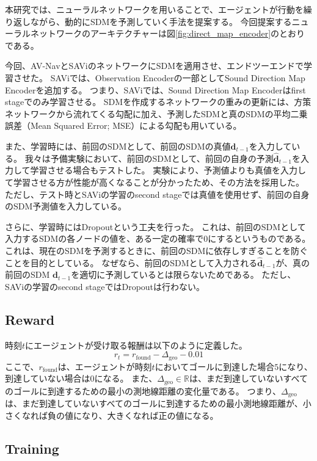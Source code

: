 本研究では、ニューラルネットワークを用いることで、エージェントが行動を繰り返しながら、動的にSDMを予測していく手法を提案する。
今回提案するニューラルネットワークのアーキテクチャーは図\ref{fig:direct_map_encoder}のとおりである。

今回、AV-Nav\cite{chen2020soundspaces}とSAVi\cite{chen2021semantic}のネットワークにSDMを適用させ、エンドツーエンドで学習させた。
SAViでは、Observation Encoderの一部としてSound Direction Map Encoderを追加する。
つまり、SAViでは、Sound Direction Map Encoderはfirst stageでのみ学習させる。
SDMを作成するネットワークの重みの更新には、方策ネットワークから流れてくる勾配に加え、予測したSDMと真のSDMの平均二乗誤差（Mean Squared Error; MSE）による勾配も用いている。

また、学習時には、前回のSDMとして、前回のSDMの真値$\boldsymbol{d}_{t-1}$を入力している。
我々は予備実験において、前回のSDMとして、前回の自身の予測$\hat{\boldsymbol{d}}_{t-1}$を入力して学習させる場合もテストした。
実験により、予測値よりも真値を入力して学習させる方が性能が高くなることが分かったため、その方法を採用した。
ただし、テスト時とSAViの学習のsecond stageでは真値を使用せず、前回の自身のSDM予測値を入力している。

さらに、学習時にはDropoutという工夫を行った。
これは、前回のSDMとして入力するSDMの各ノードの値を、ある一定の確率で0にするというものである。
これは、現在のSDMを予測するときに、前回のSDMに依存しすぎることを防ぐことを目的としている。
なぜなら、前回のSDMとして入力される$\hat{\boldsymbol{d}}_{t-1}$が、真の前回のSDM $\boldsymbol{d}_{t-1}$を適切に予測しているとは限らないためである。
ただし、SAViの学習のsecond stageではDropoutは行わない。


\subsection{Reward}

時刻$t$にエージェントが受け取る報酬は以下のように定義した。
\[
r_t = r_{\mathrm{found}} - \Delta_{\mathrm{geo}} - 0.01 \label{eq:reward_definition}
\]
ここで、$r_{\mathrm{found}}$は、エージェントが時刻$t$においてゴールに到達した場合$5$になり、到達していない場合は$0$になる。
また、$\Delta_{\mathrm{geo}} \in \mathbb{R}$は、まだ到達していないすべてのゴールに到達するための最小の測地線距離の変化量である。
つまり、$\Delta_{\mathrm{geo}}$は、まだ到達していないすべてのゴールに到達するための最小測地線距離が、小さくなれば負の値になり、大きくなれば正の値になる。



\subsection{Training}

